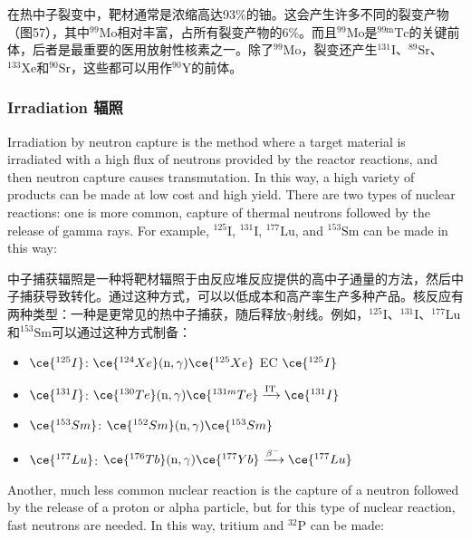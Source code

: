 \documentclass[dvipsnames, svgnames,a4paper,11pt]{article}
\begin{document}
在热中子裂变中，靶材通常是浓缩高达93\%的铀。这会产生许多不同的裂变产物（图57），其中${}^\text{99}\text{Mo}$相对丰富，占所有裂变产物的6\%。而且${}^\text{99}\text{Mo}$是${}^\text{99m}\text{Tc}$的关键前体，后者是最重要的医用放射性核素之一。除了${}^\text{99}\text{Mo}$，裂变还产生${}^\text{131}\text{I}$、${}^\text{89}\text{Sr}$、${}^\text{133}\text{Xe}$和${}^\text{90}\text{Sr}$，这些都可以用作${}^\text{90}\text{Y}$的前体。

\subsubsection{Irradiation 辐照}

Irradiation by neutron capture is the method where a target material is irradiated with a high flux of neutrons provided by the reactor reactions, and then neutron capture causes transmutation. In this way, a high variety of products can be made at low cost and high yield. There are two types of nuclear reactions: one is more common, capture of thermal neutrons followed by the release of gamma rays. For example, ${}^\text{125}\text{I}$, ${}^\text{131}\text{I}$, ${}^\text{177}\text{Lu}$, and ${}^\text{153}\text{Sm}$ can be made in this way:

中子捕获辐照是一种将靶材辐照于由反应堆反应提供的高中子通量的方法，然后中子捕获导致转化。通过这种方式，可以以低成本和高产率生产多种产品。核反应有两种类型：一种是更常见的热中子捕获，随后释放$\gamma$射线。例如，${}^\text{125}\text{I}$、${}^\text{131}\text{I}$、${}^\text{177}\text{Lu}$和${}^\text{153}\text{Sm}$可以通过这种方式制备：

\begin{itemize}
    \item \(\ce{^{125}I}\): \(\ce{^{124}Xe} (\text{n}, \gamma) \ce{^{125}Xe}\) EC \(\ce{^{125}I}\)
    
    \item \(\ce{^{131}I}\): \(\ce{^{130}Te} (\text{n}, \gamma) \ce{^{131m}Te} \xrightarrow{\text{IT}} \ce{^{131}I}\)
    
    \item \(\ce{^{153}Sm}\): \(\ce{^{152}Sm} (\text{n}, \gamma) \ce{^{153}Sm}\)
    
    \item \(\ce{^{177}Lu}\): \(\ce{^{176}Tb} (\text{n}, \gamma) \ce{^{177}Yb} \xrightarrow{\beta^-} \ce{^{177}Lu}\)
  \end{itemize}
  

Another, much less common nuclear reaction is the capture of a neutron followed by the release of a proton or alpha particle, but for this type of nuclear reaction, fast neutrons are needed. In this way, tritium and ${}^\text{32}\text{P}$ can be made:
\end{document}
